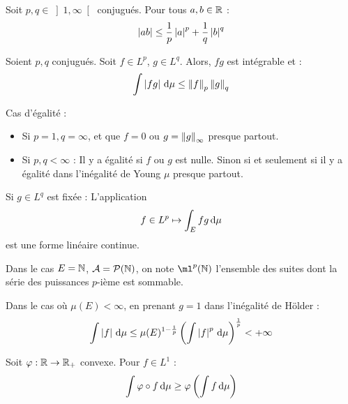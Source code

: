 \documentclass{cours}
\begin{document}
        \begin{lemma}
            Soit $p, q \in \left]1, \infty\right[$ conjugués. Pour tous $a, b \in \mathbb{R}$ : 
            \[
                \left|ab\right| \leq \frac{1}{p}\left|a\right|^{p} + \frac{1}{q}\left|b\right|^{q}
            \]  
        \end{lemma}
        \begin{proposition}
            Soient $p, q$ conjugués. Soit $f \in L^{p}$, $g \in L^{q}$. Alors, $fg$ est intégrable et : 
            \[  
                \int \left|fg\right| {\rm \, d} \mu \leq \left\lVert f \right\rVert_{p}\left\lVert g \right\rVert_{q}
            \]
        \end{proposition}
        \begin{remark}
            Cas d'égalité : 
            \begin{itemize}
                \item Si $p = 1, q = \infty$, et que $f = 0$ ou $g = \left\lVert g \right\rVert_{\infty}$ presque partout.
                \item Si $p, q < \infty$ : Il y a égalité si $f$ ou $g$ est nulle. Sinon si et seulement si il y a égalité dans l'inégalité de Young $\mu$ presque partout. 
            \end{itemize}
        \end{remark}
        \begin{remark}
            Si $g \in L^{q}$ est fixée : L'application 
            \[
                f \in L^{p} \mapsto \int_{E}fg {\rm \, d} \mu    
            \]
            est une forme linéaire continue. 
        \end{remark}
        \begin{remark}
            Dans le cas $E = \mathbb{N}$, $\mathcal{A} = \mathcal{P}(\mathbb{N})$, on note $\ml^{p}(\N)$ l'ensemble des suites dont la série des puissances $p$-ième est sommable.
        \end{remark}

        \begin{remark}
            Dans le cas où $\mu(E)< \infty$, en prenant $g = 1$ dans l'inégalité de Hölder : 
            \[
                \int \left|f\right| {\rm \, d} \mu \leq \mu(E)^{1 - \frac{1}{p}} \left(\int \left|f\right|^{p} {\rm \, d}\mu\right)^{\frac{1}{p}} < + \infty
            \]
        \end{remark}

        \begin{proposition}
            Soit $\varphi : \mathbb{R} \rightarrow \mathbb{R}_{+}$ convexe. Pour $f \in L^{1}$ :
            \[
                \int \varphi \circ f {\rm \, d}\mu \geq \varphi \left(\int f {\rm \, d}\mu\right)    
            \]
        \end{proposition}
\end{document}
